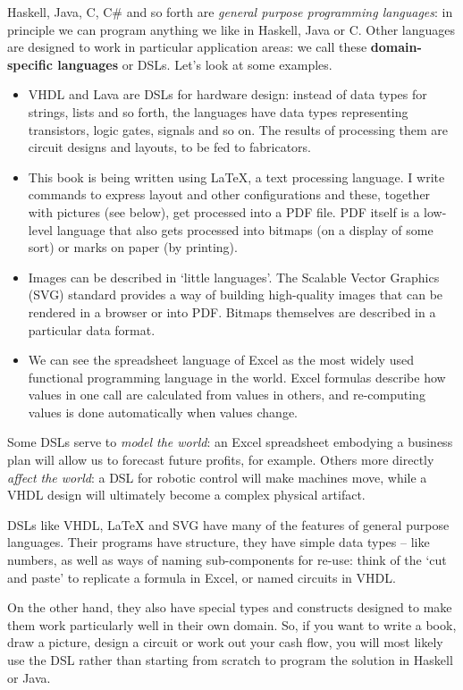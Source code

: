 Haskell, Java, C, C\# and so forth are \emph{general purpose programming languages}: in principle we can program anything we like in Haskell, Java or C. Other languages are designed to work in particular application areas: we call these \textbf{domain-specific languages} or DSLs. Let's look at some examples.
\begin{itemize}
\item
VHDL and Lava are DSLs for hardware design: instead of data types for strings, lists and so forth, the languages have data types representing transistors, logic gates, signals and so on. The results of processing them are circuit designs and layouts, to be fed to fabricators.
\item
This book is being written using LaTeX, a text processing language. I write commands to express layout and other configurations and these, together with pictures (see below), get processed into a PDF file. PDF itself is a low-level language that also gets processed into bitmaps (on a display of some sort) or marks on paper (by printing).
\item
Images can be described in `little languages'. The Scalable Vector Graphics (SVG) standard provides a way of building high-quality images that can be rendered in a browser or into  PDF. Bitmaps themselves are described in a particular data format.
\item
We can see the spreadsheet language of Excel as the most widely used functional programming language in the world. Excel formulas describe how values in one call are calculated from values in others, and re-computing values is done automatically when values change.
\end{itemize}
Some DSLs serve to \emph{model the world}: an Excel spreadsheet embodying a business plan will allow us to forecast future profits, for example. Others more directly \emph{affect the world}: a DSL for robotic control will make machines move, while a VHDL design will ultimately become a complex physical artifact.

DSLs like VHDL, LaTeX and SVG have many of the features of general purpose languages. Their programs have structure, they have simple data types -- like numbers, as well as ways of naming sub-components for re-use: think of the `cut and paste' to replicate a formula in Excel, or named circuits in VHDL. 

On the other hand, they also have special types and constructs designed to make them work particularly well in their own domain. So, if you want to write a book, draw a picture, design a circuit or work out your cash flow, you will most likely use the DSL rather than starting from scratch to program the solution in Haskell or Java.

